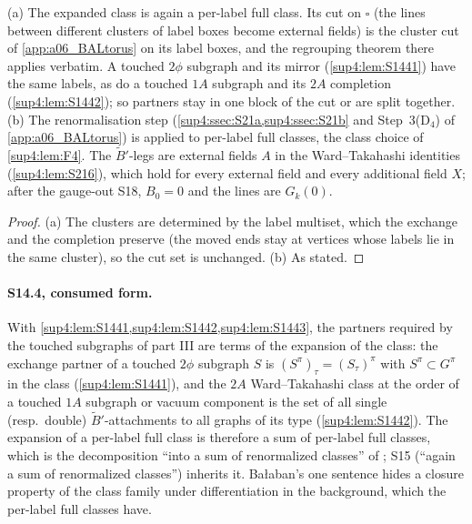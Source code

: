 \begin{lemma}\label{sup4:lem:S1443}
\textup{(a)} The expanded class is again a per-label full class. Its cut on $\square$ (the lines between different clusters of label boxes become external fields) is the cluster cut of \cref{app:a06_BALtorus} on its label boxes, and the regrouping theorem there applies verbatim. A touched $2\phi$ subgraph and its mirror (\cref{sup4:lem:S1441}) have the same labels, as do a touched $1A$ subgraph and its $2A$ completion (\cref{sup4:lem:S1442}); so partners stay in one block of the cut or are split together. \textup{(b)} The renormalisation step (\cref{sup4:ssec:S21a,sup4:ssec:S21b} and Step~3(D$_4$) of \cref{app:a06_BALtorus}) is applied to per-label full classes, the class choice of \cref{sup4:lem:F4}. The $\tilde B'$-legs are external fields $A$ in the Ward--Takahashi identities (\cref{sup4:lem:S216}), which hold for every external field and every additional field $X$; after the gauge-out S18, $B_0=0$ and the lines are $G_k(0)$.
\end{lemma}

\begin{proof}
(a) The clusters are determined by the label multiset, which the exchange and the completion preserve (the moved ends stay at vertices whose labels lie in the same cluster), so the cut set is unchanged. (b) As stated.
\end{proof}

\paragraph{S14.4, consumed form.} With \cref{sup4:lem:S1441,sup4:lem:S1442,sup4:lem:S1443}, the partners required by the touched subgraphs of part III are terms of the expansion of the class: the exchange partner of a touched $2\phi$ subgraph $S$ is $(S^\pi)_\tau=(S_\tau)^\pi$ with $S^\pi\subset G^\pi$ in the class (\cref{sup4:lem:S1441}), and the $2A$ Ward--Takahashi class at the order of a touched $1A$ subgraph or vacuum component is the set of all single (resp.\ double) $\tilde B'$-attachments to all graphs of its type (\cref{sup4:lem:S1442}). The expansion of a per-label full class is therefore a sum of per-label full classes, which is the decomposition ``into a sum of renormalized classes'' of \cite[p.~433]{Ba3}; S15 (``again a sum of renormalized classes'') inherits it. Ba{\l}aban's one sentence hides a closure property of the class family under differentiation in the background, which the per-label full classes have.
